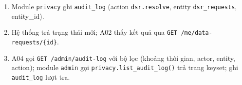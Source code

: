 \begin{enumerate}
\item Module {\small\texttt{privacy}} ghi {\small\texttt{audit\_\allowbreak{}\allowbreak{}log}} (action {\small\texttt{dsr.\allowbreak{}resolve}}, entity {\small\texttt{dsr\_\allowbreak{}\allowbreak{}requests}}, entity\_\allowbreak{}id).
\item Hệ thống trả trạng thái mới; A02 thấy kết quả qua {\small\texttt{GET /\allowbreak{}\allowbreak{}me/\allowbreak{}\allowbreak{}data-\allowbreak{}requests/\allowbreak{}\allowbreak{}\{id\}}}.
\item A04 gọi {\small\texttt{GET /\allowbreak{}\allowbreak{}admin/\allowbreak{}\allowbreak{}audit-\allowbreak{}log}} với bộ lọc (khoảng thời gian, actor, entity, action); module {\small\texttt{admin}} gọi {\small\texttt{privacy.\allowbreak{}list\_\allowbreak{}\allowbreak{}audit\_\allowbreak{}\allowbreak{}log()}} trả trang keyset; ghi {\small\texttt{audit\_\allowbreak{}\allowbreak{}log}} lượt tra.
\end{enumerate}
